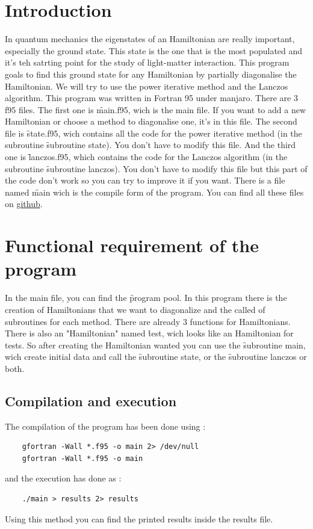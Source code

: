 \documentclass[1pt, a4paper]{article}
\begin{document}
\maketitlepage
\tableofcontents
\newpage
\section{Introduction}
\label{sec:intro}
\noindent
In quantum mechanics the eigenstates of an Hamiltonian are really important, especially the ground state. This state is the one that is the most populated and it's teh satrting point for the study of light-matter interaction. This program goals to find this ground state for any Hamiltonian by partially diagonalise the Hamiltonian. We will try to use the power iterative method and the Lanczos algorithm. This program was written in Fortran 95 under manjaro. There are 3 f95 files. The first one is \f{main.f95}, wich is the main file. If you want to add a new Hamiltonian or choose a method to diagonalise one, it's in this file. The second file is  \f{state.f95}, wich contains all the code for the power iterative method (in the subroutine \f{subroutine state}). You don't have to modify this file. And the third one is \f{lanczos.f95}, which contains the code for the Lanczos algorithm (in the subroutine \f{subroutine lanczos}). You don't have to modify this file but this part of the code don't work so you can try to improve it if you want. There is a file named \f{main} wich is the compile form of the program. You can find all these files on \href{https://github.com/faucheresse/fortran-swimming-pool.git}{github}.
\section{Functional requirement of the program}
\label{sec:2}
\noindent
In the main file, you can find the \f{program pool}. In this program there is the creation of Hamiltonians that we want to diagonalize and the called of subroutines for each method. There are already 3 functions for Hamiltonians. There is also an "Hamiltonian" named \f{test}, wich looks like an Hamiltonian for tests. So after creating the Hamiltonian wanted you can use the \f{subroutine main}, wich create initial data and call the \f{subroutine state}, or the \f{subroutine lanczos} or both.
\subsection{Compilation and execution}
\label{sub:comp}
\noindent
The compilation of the program has been done using :
\begin{verbatim}
    gfortran -Wall *.f95 -o main 2> /dev/null
    gfortran -Wall *.f95 -o main
\end{verbatim}
and the execution has done as :
\begin{verbatim}
    ./main > results 2> results
\end{verbatim}
Using this method you can find the printed results inside the results file.
\end{document}
